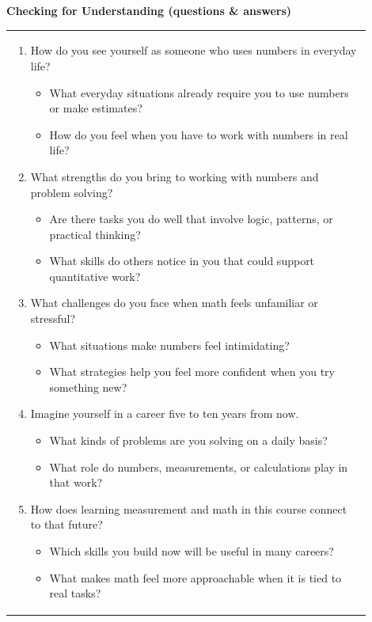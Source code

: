 \documentclass{article}
\begin{document}
\newpage
\noindent
{\large \textbf{Checking for Understanding (questions \& answers)}} \\
\begin{tabular}{|p{0.9\linewidth}|}
\hline
\begin{enumerate}
    \item How do you see yourself as someone who uses numbers in everyday life?
    \begin{itemize}
        \item What everyday situations already require you to use numbers or make estimates?
        \item How do you feel when you have to work with numbers in real life?
    \end{itemize}
    \item What strengths do you bring to working with numbers and problem solving?
    \begin{itemize}
        \item Are there tasks you do well that involve logic, patterns, or practical thinking?
        \item What skills do others notice in you that could support quantitative work?
    \end{itemize}
    \item What challenges do you face when math feels unfamiliar or stressful?
    \begin{itemize}
        \item What situations make numbers feel intimidating?
        \item What strategies help you feel more confident when you try something new?
    \end{itemize}
    \item Imagine yourself in a career five to ten years from now.
    \begin{itemize}
        \item What kinds of problems are you solving on a daily basis?
        \item What role do numbers, measurements, or calculations play in that work?
    \end{itemize}
    \item How does learning measurement and math in this course connect to that future?
    \begin{itemize}
        \item Which skills you build now will be useful in many careers?
        \item What makes math feel more approachable when it is tied to real tasks?

\end{itemize}
\end{enumerate}
\end{tabular}
\end{document}
